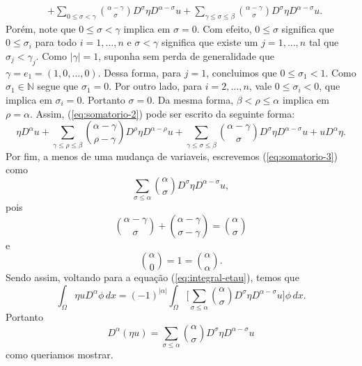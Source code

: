 \documentclass[a4paper, 11pt]{book}
\theoremstyle{definition}
\newcommand{\bN}{\mathbb{N}}
\begin{document}
\begin{prf}
\begin{equation}
\begin{aligned}
            &+ \sum_{0 \leqslant \sigma < \gamma} \binom{\alpha - \gamma}{\sigma} D^{\sigma} \eta D^{\alpha - \sigma} u + \sum_{\gamma \leqslant \sigma \leqslant \beta} \binom{\alpha - \gamma}{\sigma} D^{\sigma} \eta D^{\alpha - \sigma} u.
           \end{aligned}
    \end{equation}
    Porém, note que $0 \leqslant \sigma < \gamma$ implica em $\sigma = 0$. Com efeito, $0 \leqslant \sigma$ significa que $0 \leqslant \sigma_i$ para todo $i = 1,\dots,n$ e $\sigma < \gamma$ significa que existe um $j = 1,\dots,n$ tal que $\sigma_j < \gamma_j$. Como $|\gamma| = 1$, suponha sem perda de generalidade que $\gamma = e_1 = (1,0,\dots,0)$.
    Dessa forma, para $j = 1$, concluimos que $0 \leqslant \sigma_1 < 1$.
    Como $\sigma_1 \in \bN$ segue que $\sigma_1 = 0$. Por outro lado, para $i = 2,\dots,n$, vale $0 \leqslant \sigma_i < 0$,
    que implica em $\sigma_i = 0$. Portanto $\sigma = 0$.
    Da mesma forma, $\beta < \rho \leqslant \alpha$ implica em $\rho =\alpha$.
    Assim, (\ref{eq:somatorio-2}) pode ser escrito da seguinte forma:
    \begin{equation} \label{eq:somatorio-3}
        \eta D^{\alpha} u + \sum_{\gamma \leqslant \rho \leqslant \beta} \binom{\alpha - \gamma}{\rho - \gamma} D^{\rho}\eta D^{\alpha - \rho} u + \sum_{\gamma \leqslant \sigma \leqslant \beta} \binom{\alpha - \gamma}{\sigma} D^{\sigma} \eta D^{\alpha - \sigma} u + 
        u D^{\alpha}\eta.
    \end{equation}
    Por fim, a menos de uma mudança de variaveis, escrevemos (\ref{eq:somatorio-3}) como
    \[
        \sum_{\sigma \leqslant \alpha} \binom{\alpha}{\sigma} D^{\sigma} \eta D^{\alpha - \sigma} u,
    \]
    pois
    \[
        \binom{\alpha - \gamma}{\sigma} + \binom{\alpha - \gamma}{\sigma - \gamma} = \binom{\alpha}{\sigma}
    \]
    e
    \[
        \binom{\alpha}{0} = 1 = \binom{\alpha}{\alpha}.
    \]
    Sendo assim, voltando para a equação (\ref{eq:integral-etau}), temos que
    \[
        \int_\Omega \eta u D^{\alpha}\phi \, dx = (-1)^{|\alpha|} \int_\Omega \bigg[\sum_{\sigma \leqslant \alpha} \binom{\alpha}{\sigma} D^{\sigma} \eta D^{\alpha - \sigma} u\bigg] \phi \,dx.
    \]
    Portanto
    \[
        D^\alpha (\eta u) = \sum_{\sigma \leqslant \alpha} \binom{\alpha}{\sigma} D^{\sigma} \eta D^{\alpha - \sigma} u
    \]
    como queriamos mostrar.
\end{prf}
\end{document}

